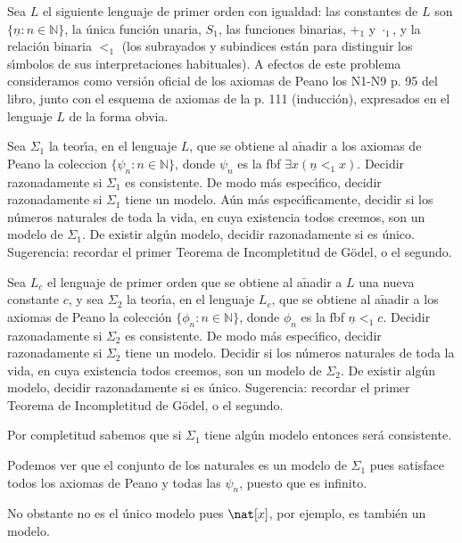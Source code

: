 \begin{problem}
Sea  $L$  el siguiente lenguaje de primer orden  con igualdad: las constantes de $L$ son
$\{\underline{n}: n\in\mathbb{N}\}$, la \'unica funci\'on unaria, $S_1$, las funciones binarias,
$+_1$ y $\cdot_1$, y la relaci\'on binaria $<_1$ (los subrayados y subindices est\'an para
distinguir los s\'{\i}mbolos de sus interpretaciones habituales). A efectos de este problema
consideramos como versi\'on oficial de los axiomas de Peano los N1-N9 p. 95 del libro, junto con el esquema
de axiomas de la p. 111 (inducci\'on), expresados en el lenguaje $L$ de la forma
obvia.

\ppart Sea $\Sigma_1$ la teor\'{\i}a,
 en el lenguaje $L$, que se obtiene al a$\operatorname{\tilde{n}}$adir a los
axiomas de Peano la coleccion $\{ \psi_n: n\in\mathbb{N}\}$, donde
$\psi_n$ es la fbf $\exists x (\underline{n} <_1 x )$.
 Decidir razonadamente si
$\Sigma_1$ es consistente. De modo m\'as espec\'{\i}fico, decidir razonadamente si $\Sigma_1$ tiene un modelo.  A\'un m\'as espec\'{\i}ficamente, decidir si los n\'umeros naturales
de toda la vida, en cuya existencia todos creemos,  son un modelo de $\Sigma_1$.
De existir alg\'un modelo, decidir razonadamente si es \'unico.
Sugerencia: recordar el primer Teorema de Incompletitud de G\"odel, o el segundo.

\ppart Sea $L_c$ el lenguaje de primer orden que se obtiene al a$\operatorname{\tilde{n}}$adir
a $L$ una nueva constante $c$, y sea
$\Sigma_2$ la teor\'{\i}a,
 en el lenguaje $L_c$, que se obtiene al a$\operatorname{\tilde{n}}$adir a los
axiomas de Peano la colección $\{ \phi_n: n\in\mathbb{N}\}$, donde
$\phi_n$ es la fbf $\underline{n} <_1 c$.
Decidir razonadamente si
$\Sigma_2$ es consistente. De modo m\'as espec\'{\i}fico, decidir razonadamente si $\Sigma_2$ tiene un modelo.  Decidir si los n\'umeros naturales
de toda la vida, en cuya existencia todos creemos,  son un modelo de $\Sigma_2$.
De existir alg\'un modelo, decidir razonadamente si es \'unico.
Sugerencia: recordar el primer Teorema de Incompletitud de G\"odel, o el segundo.
\solution 
\spart

Por completitud sabemos que si $Σ_1$ tiene algún modelo entonces será consistente.

Podemos ver que el conjunto de los naturales es un modelo de $Σ_1$ pues satisface todos los axiomas de Peano y todas las $\psi_n$, puesto que es infinito.

No obstante no es el único modelo pues $\nat[x]$, por ejemplo, es también un modelo.


\end{problem}
